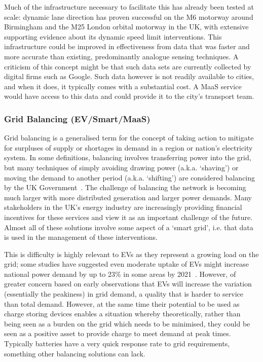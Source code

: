 \documentclass[journal]{IEEEtran}
\begin{document}
Much of the infrastructure necessary to facilitate this has already
been tested at scale: dynamic lane direction has proven successful on
the M6 motorway around Birmingham and the M25 London orbital motorway
in the UK, with extensive supporting evidence about its dynamic speed
limit interventions. This infrastructure could be improved in
effectiveness from data that was faster and more accurate than
existing, predominantly analogue sensing techniques.  A criticism of
this concept might be that such data sets are currently collected by
digital firms such as Google. Such data however is not readily
available to cities, and when it does, it typically comes with a
substantial cost. A MaaS service would have access to this data and
could provide it to the city's transport team.


\subsubsection{Grid Balancing (EV/Smart/MaaS)} 

Grid balancing is a generalised term for the concept of taking action
to mitigate for surpluses of supply or shortages in demand in a region
or nation’s electricity system. In some definitions, balancing
involves transferring power into the grid, but many techniques of
simply avoiding drawing power (a.k.a. `shaving') or moving the demand
to another period (a.k.a. `shifting') are considered balancing by the
UK Government~\cite{decc:2014}. The challenge of balancing the network
is becoming much larger with more distributed generation and larger
power demands. Many stakeholders in the UK's energy industry are
increasingly providing financial incentives for these services and
view it as an important challenge of the future. Almost all of these
solutions involve some aspect of a `smart grid', i.e. that data is
used in the management of these interventions.

This is difficulty is highly relevant to EVs as they represent a
growing load on the grid; some studies have suggested even moderate
uptake of EVs might increase national power demand by up to 23\% in
some areas by 2021~\cite{paffumi-et-al:2015}. However, of greater
concern based on early observations that EVs will increase the
variation (essentially the peakiness) in grid demand, a quality that
is harder to service than total demand. However, at the same time
their potential to be used as charge storing devices enables a
situation whereby theoretically, rather than being seen as a burden on
the grid which needs to be minimised, they could be seen as a positive
asset to provide charge to meet demand at peak times. Typically
batteries have a very quick response rate to grid requirements,
something other balancing solutions can lack.
\end{document}

